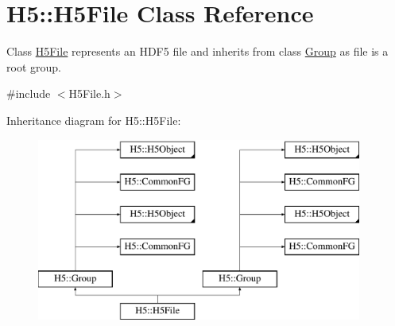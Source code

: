 \hypertarget{class_h5_1_1_h5_file}{}\section{H5\+:\+:H5\+File Class Reference}
\label{class_h5_1_1_h5_file}


Class \hyperlink{class_h5_1_1_h5_file}{H5\+File} represents an H\+D\+F5 file and inherits from class \hyperlink{class_h5_1_1_group}{Group} as file is a root group.  




{\ttfamily \#include $<$H5\+File.\+h$>$}

Inheritance diagram for H5\+:\+:H5\+File\+:\begin{figure}[H]
\begin{center}
\leavevmode
\includegraphics[height=6.000000cm]{class_h5_1_1_h5_file}
\end{center}
\end{figure}
